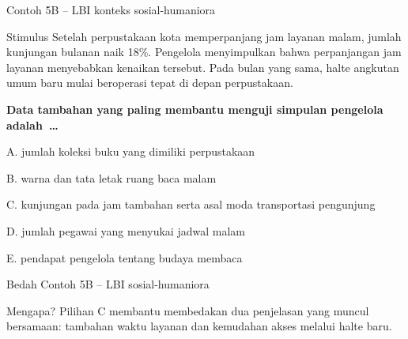 \begin{frame}[shrink=10]{Contoh 5B -- LBI konteks sosial-humaniora}
  \begin{block}{Stimulus}
    Setelah perpustakaan kota memperpanjang jam layanan malam, jumlah kunjungan bulanan naik 18\%. Pengelola menyimpulkan bahwa perpanjangan jam layanan menyebabkan kenaikan tersebut. Pada bulan yang sama, halte angkutan umum baru mulai beroperasi tepat di depan perpustakaan.
  \end{block}
  {\bfseries Data tambahan yang paling membantu menguji simpulan pengelola adalah~\ldots}\par
  \vspace{0.07cm}
  {\fontsize{9.3}{11.4}\selectfont
  A. jumlah koleksi buku yang dimiliki perpustakaan\par\vspace{0.04cm}
  B. warna dan tata letak ruang baca malam\par\vspace{0.04cm}
  C. kunjungan pada jam tambahan serta asal moda transportasi pengunjung\par\vspace{0.04cm}
  D. jumlah pegawai yang menyukai jadwal malam\par\vspace{0.04cm}
  E. pendapat pengelola tentang budaya membaca}
\end{frame}

\begin{frame}{Bedah Contoh 5B -- LBI sosial-humaniora}
  \vspace{0.20cm}
  \begin{block}{Mengapa?}
    Pilihan C membantu membedakan dua penjelasan yang muncul bersamaan: tambahan waktu layanan dan kemudahan akses melalui halte baru.
  \end{block}
  {\fontsize{10.6}{13.2}\selectfont
  \par\vspace{0.16cm}
  }
\end{frame}

